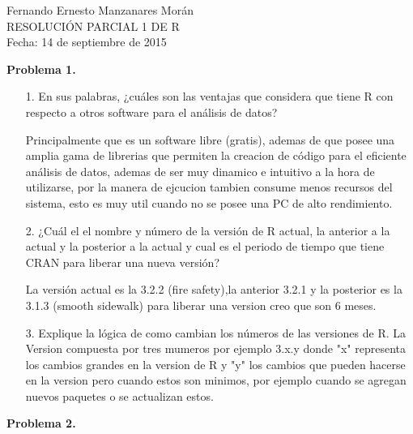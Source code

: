 \documentclass{article}
\begin{document}

\begin{center}
Fernando Ernesto Manzanares Morán
\\ RESOLUCIÓN PARCIAL 1 DE R
\\ Fecha: 14 de septiembre de 2015 

\end{center}
\textbf{Problema 1.}
\begin{itemize}
\item [1.]En sus palabras, ¿cuáles son las ventajas que considera que tiene R con respecto a otros software para el análisis de datos?

\subitem Principalmente que es un software libre (gratis), ademas de que posee una amplia gama de librerias que permiten la creacion de código para el eficiente análisis de datos, ademas de ser muy dinamico e intuitivo a la hora de utilizarse, por la manera de ejcucion tambien consume menos recursos del sistema, esto es muy util cuando no se posee una PC de alto rendimiento.

\item [2.] ¿Cuál el el nombre y número de la versión de R actual, la anterior a la actual y la posterior a la actual y cual es el periodo de tiempo que tiene CRAN para liberar una nueva versión?

\subitem La versión actual es la 3.2.2 (fire safety),la anterior 3.2.1 y la posterior es la 3.1.3 (smooth sidewalk) para liberar una version creo que son 6 meses.

\item [3.] Explique la lógica de como cambian los números de las versiones de R.
\subitem La Version compuesta por tres mumeros por ejemplo 3.x.y donde "x" representa los cambios grandes en la version de R y "y" los cambios que pueden hacerse en la version pero cuando estos son minimos, por ejemplo cuando se agregan nuevos paquetes o se actualizan estos.

\end{itemize}

\textbf{Problema 2.}
\end{document}
